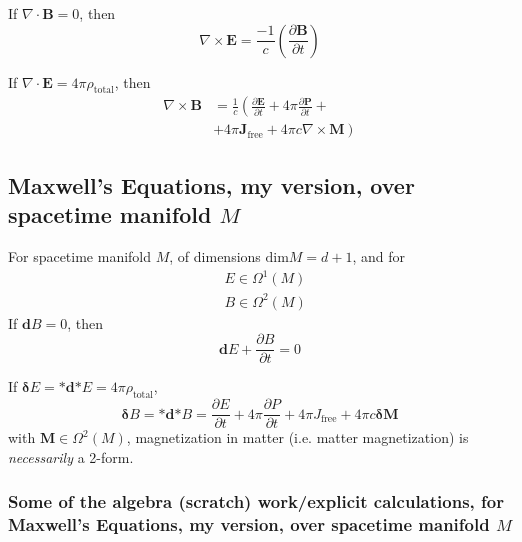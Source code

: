 \documentclass[10pt]{amsart}
\begin{document}
\begin{multicols*}{2}
If $\nabla \cdot \mathbf{B} = 0$, then
\begin{equation}
	\nabla \times \mathbf{E} = \frac{-1}{c} \left( \frac{ \partial \mathbf{B} }{\partial t} \right)
\end{equation}

If $\nabla \cdot \mathbf{E} = 4\pi \rho_{\text{total}}$, then 
\begin{equation}
\begin{aligned}
	\nabla \times \mathbf{B} & = \frac{1}{c} \left( \frac{ \partial \mathbf{E}}{ \partial t} + 4\pi \frac{ \partial \mathbf{P} }{ \partial t} +  \right.  \\
	& \left.   + 4\pi \mathbf{J}_{\text{free}} + 4\pi c \nabla \times \mathbf{M}  \right)
\end{aligned}
\end{equation}

\subsection{Maxwell's Equations, my version, over spacetime manifold $M$}

For spacetime manifold $M$, of dimensions $\text{dim}M = d+1$, and for 
\[
\begin{aligned}
	& E \in \Omega^1(M) \\ 
	& B \in \Omega^2(M)
\end{aligned}
\]
If $\mathbf{d}B=0$, then 
\begin{equation}\label{Eq:MaxwellsEqnsDGEBInduction}
\boxed{ 	\mathbf{d}E + \frac{ \partial B}{ \partial t} = 0  }
\end{equation}

If $\mathbf{\delta}E = \mathbf{*} \mathbf{d} \mathbf{*} E = 4\pi \rho_{\text{total}}$, 
\begin{equation}\label{Eq:MaxwellsEqnsDGEBFaraday}
	\boxed{ \mathbf{\delta} B = \mathbf{*} \mathbf{d} \mathbf{*} B = \frac{ \partial E}{ \partial t} + 4\pi \frac{ \partial P}{ \partial t} + 4\pi J_{\text{free}} + 4\pi c \mathbf{\delta} \mathbf{M} }
\end{equation}
with $\mathbf{M} \in \Omega^2(M)$, magnetization in matter (i.e. matter magnetization) is \emph{necessarily} a 2-form.  

\subsubsection{Some of the algebra (scratch) work/explicit calculations, for Maxwell's Equations, my version, over spacetime manifold $M$}


\end{multicols*}
\end{document}
